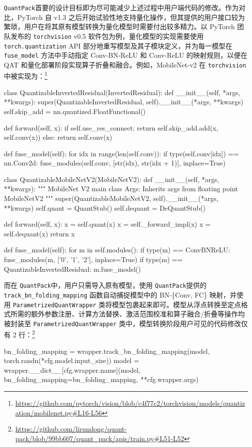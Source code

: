 \documentclass[
]{shtthesis}
\providecommand{\QP}{\texttt{QuantPack}}
\begin{document}
\QP 首要的设计目标即为尽可能减少上述过程中用户端代码的修改。作为对比，PyTorch 自 v1.3 之后开始试验性地支持量化操作，但其提供的用户接口较为繁琐，用户在将其原有模型转换为量化模型时需要付出较多精力。以 PyTorch 团队发布的 \verb|torchvision| v0.5 软件包为例，量化模型的实现需要使用 \verb|torch.quantization| API 部分地重写模型及其子模块定义，并为每一模型在 \verb|fuse_model| 方法中手动指定 Conv-BN-ReLU 和 Conv-ReLU 的映射规则，以便在 QAT 和量化部署阶段实现算子折叠和融合。例如，MobileNet-v2 在 \verb|torchvision| 中被实现为：\footnote{\url{https://github.com/pytorch/vision/blob/c4f77c2/torchvision/models/quantization/mobilenet.py\#L16-L56}}
\begin{python}
class QuantizableInvertedResidual(InvertedResidual):
    def __init__(self, *args, **kwargs):
        super(QuantizableInvertedResidual, self).__init__(*args, **kwargs)
        self.skip_add = nn.quantized.FloatFunctional()

    def forward(self, x):
        if self.use_res_connect:
            return self.skip_add.add(x, self.conv(x))
        else:
            return self.conv(x)

    def fuse_model(self):
        for idx in range(len(self.conv)):
            if type(self.conv[idx]) == nn.Conv2d:
                fuse_modules(self.conv, [str(idx), str(idx + 1)], inplace=True)


class QuantizableMobileNetV2(MobileNetV2):
    def __init__(self, *args, **kwargs):
        """
        MobileNet V2 main class
        Args:
          Inherits args from floating point MobileNetV2
        """
        super(QuantizableMobileNetV2, self).__init__(*args, **kwargs)
        self.quant = QuantStub()
        self.dequant = DeQuantStub()

    def forward(self, x):
        x = self.quant(x)
        x = self._forward_impl(x)
        x = self.dequant(x)
        return x

    def fuse_model(self):
        for m in self.modules():
            if type(m) == ConvBNReLU:
                fuse_modules(m, ['0', '1', '2'], inplace=True)
            if type(m) == QuantizableInvertedResidual:
                m.fuse_model()
\end{python}

而在 \QP 中，用户只需导入原有模型，使用 \QP 提供的 \verb|track_bn_folding_mapping| 函数自动捕捉模型中的 BN-\{Conv, FC\} 映射，并使用 \verb|ParametrizedQuantWrapper| 类将模型包裹起来即可。模型从浮点转换至定点格式所需的额外参数注册、计算方法替换、激活范围校准和算子融合/折叠等操作均被封装至 \verb|ParametrizedQuantWrapper| 类中，模型转换阶段用户可见的代码修改仅有 2 行：\footnote{\url{https://github.com/lirundong/quant-pack/blob/99bb607/quant_pack/apis/train.py\#L51-L52}}
\begin{python}
bn_folding_mapping = wrapper.track_bn_folding_mapping(model, torch.randn(*cfg.model.input_size))
model = wrapper.__dict__[cfg.wrapper.name](model, bn_folding_mapping=bn_folding_mapping, **cfg.wrapper.args)
\end{python}
\end{document}
